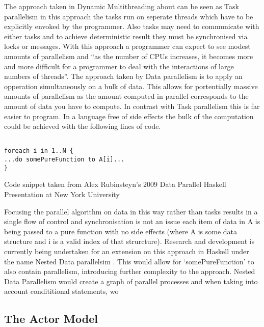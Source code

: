 \documentclass[main.tex]{subfiles}
\begin{document}
{{The approach taken in Dynamic Multithreading about can be seen as Task parallelism in this approach the tasks run on seperate threads which have to be explicitly envoked by the programmer. Also tasks may need to communicate with either tasks and to achieve deterministic result they must be synchronised via locks or messages. With this approach a programmer can expect to see modest amounts of parallelism and ``as the number of CPUs increases, it becomes more and more difﬁcult for a programmer to deal with the interactions of large numbers of threads''\cite{Jones2008}. The approach taken by Data parallelism is to apply an opperation simultaneously on a bulk of data. This allows for portentially massive amounts of parallelism as the amount computed in parallel corresponds to the amount of data you have to compute. In contrast with Task parallelism this is far easier to program. In a language free of side effects the bulk of the computation could be achieved with the following lines of code.


\begin{lstlisting}

foreach i in 1..N {
...do somePureFunction to A[i]...
}

\end{lstlisting}
Code snippet taken from Alex Rubinsteyn's 2009 Data Parallel Haskell Presentation at New York University \cite{Rubinsteyn2009}

Focusing the parallel algorithm on data in this way rather than tasks results in a single flow of control and synchronisation is not an issue each item of data in A is being passed to a pure function with no side effects (where A is some data structure and i is a valid index of that strurcture). Research and development is currently being undertaken for an extension on this approach in Haskell under the name Nested Data parallelsim \cite{Jones2008}. This would allow for `somePureFunction' to also contain parallelism, introducing further complexity to the approach. Nested Data Parallelism would create a graph of parallel processes and when taking into account condititional statements, wo

\subsection{The Actor Model}

}}
\end{document}

